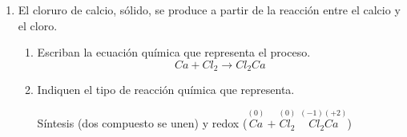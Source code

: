 \documentclass[../Práctica.root.tex]{subfiles}
\newcommand{\lra}{\ensuremath{\longrightarrow{}}}
\newcommand{\sr}[2]{\stackrel{#1}{#2}}
\begin{document}
\begin{enumerate}
    \item El cloruro de calcio, sólido, se produce a partir de la reacción entre el calcio y el cloro.
          \begin{enumerate}
              \item Escriban la ecuación química que representa el proceso.
                    \[ Ca + Cl_2 \lra Cl_2Ca \] %
              \item Indiquen el tipo de reacción química que representa.
              
                    Síntesis (dos compuesto se unen) y redox ($\sr{(0)}{Ca} + \sr{(0)}{Cl_2}$ \rightarrow $\sr{(-1)(+2)}{Cl_2Ca}$)
          \end{enumerate}
\end{enumerate}
\end{document}
